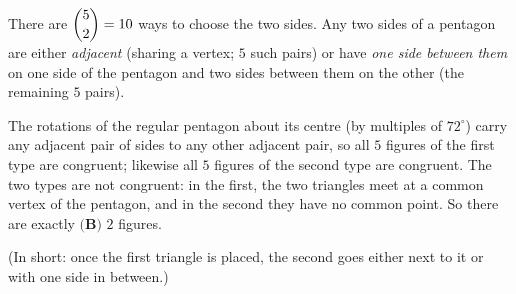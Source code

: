 There are $\dbinom52=10$ ways to choose the two sides. Any two sides of a pentagon are either \emph{adjacent} (sharing a vertex; $5$ such pairs) or have \emph{one side between them} on one side of the pentagon and two sides between them on the other (the remaining $5$ pairs).


The rotations of the regular pentagon about its centre (by multiples of $72^\circ$) carry any adjacent pair of sides to any other adjacent pair, so all $5$ figures of the first type are congruent; likewise all $5$ figures of the second type are congruent. The two types are not congruent: in the first, the two triangles meet at a common vertex of the pentagon, and in the second they have no common point. So there are exactly $\boxed{\textbf{(B) }2}$ figures.

(In short: once the first triangle is placed, the second goes either next to it or with one side in between.)
